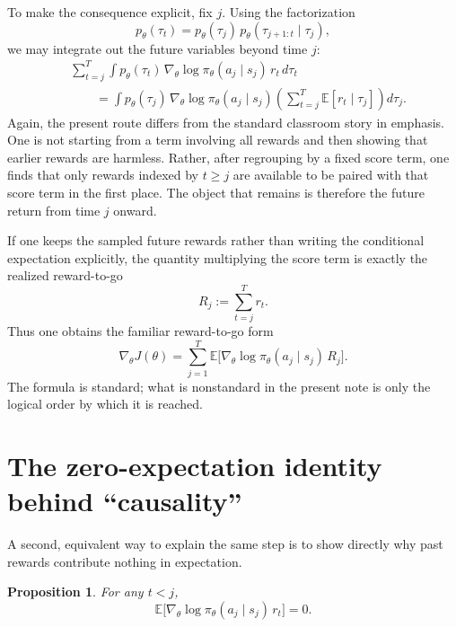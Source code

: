 \documentclass[11pt]{article}
\newtheorem{proposition}{Proposition}
\begin{document}
To make the consequence explicit, fix $j$. Using the factorization
\[
p_\theta(\tau_t)=p_\theta(\tau_j)\,p_\theta(\tau_{j+1:t}\mid \tau_j),
\]
we may integrate out the future variables beyond time $j$:
\begin{align*}
&\sum_{t=j}^T \int p_\theta(\tau_t)\,\nabla_\theta\log\pi_\theta(a_j\mid s_j)\,r_t\,d\tau_t \\
&\qquad = \int p_\theta(\tau_j)\,\nabla_\theta\log\pi_\theta(a_j\mid s_j)
\left(\sum_{t=j}^T \mathbb E[r_t\mid \tau_j]\right)d\tau_j.
\end{align*}
Again, the present route differs from the standard classroom story in emphasis. One is not starting from a term involving all rewards and then showing that earlier rewards are harmless. Rather, after regrouping by a fixed score term, one finds that only rewards indexed by $t\geq j$ are available to be paired with that score term in the first place. The object that remains is therefore the future return from time $j$ onward.

If one keeps the sampled future rewards rather than writing the conditional expectation explicitly, the quantity multiplying the score term is exactly the realized reward-to-go
\begin{equation}
R_j:=\sum_{t=j}^T r_t.
\label{eq:rtgdef}
\end{equation}
Thus one obtains the familiar reward-to-go form
\begin{equation}
\nabla_\theta J(\theta)=\sum_{j=1}^T \mathbb E\big[\nabla_\theta\log\pi_\theta(a_j\mid s_j)\,R_j\big].
\label{eq:rtgpg}
\end{equation}
The formula is standard; what is nonstandard in the present note is only the logical order by which it is reached.

\section{The zero-expectation identity behind ``causality''}
A second, equivalent way to explain the same step is to show directly why past rewards contribute nothing in expectation.

\begin{proposition}
For any $t<j$,
\begin{equation}
\mathbb E\big[\nabla_\theta\log\pi_\theta(a_j\mid s_j)\,r_t\big]=0.
\label{eq:zeroterm}
\end{equation}
\end{proposition}
\end{document}
